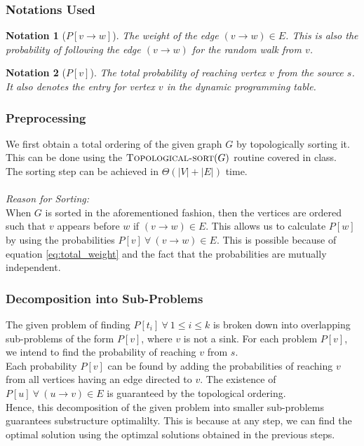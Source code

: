 \documentclass[12pt]{report}
\newtheorem{notation}{Notation}
\begin{document}
    \subsubsection*{Notations Used}
    \begin{notation}[$P{[v \to w]}$]
        The weight of the edge $(v \to w) \in E$. This is also the probability of following the edge $(v \to w)$ for the random walk from $v$.
    \end{notation}

    \begin{notation}[$P{[v]}$]
        The total probability of reaching vertex $v$ from the source $s$.
        It also denotes the entry for vertex $v$ in the dynamic programming table.
    \end{notation}

    \subsubsection*{Preprocessing}
    We first obtain a total ordering of the given graph $G$ by topologically sorting it.
    This can be done using the $\Call{Topological-sort}{G}$ routine covered in class. \\
    The sorting step can be achieved in $\Theta(|V|+|E|)$ time. \\
    \vspace*{2.5pt} \\
    \textit{Reason for Sorting:}
    \vspace*{2.5pt} \\
    When $G$ is sorted in the aforementioned fashion, then the vertices are ordered such that $v$ appears before $w$ if $(v \to w) \in E$.
    This allows us to calculate $P[w]$ by using the probabilities $P[v] \ \forall \ (v \to w) \in E$.
    This is possible because of equation \eqref{eq:total_weight} and the fact that the probabilities are mutually independent.

    \subsubsection*{Decomposition into Sub-Problems}
    The given problem of finding $P[t_{i}] \ \forall \ 1 \leq i \leq k$ is broken down into overlapping sub-problems of the form $P[v]$, where $v$ is not a sink.
    For each problem $P[v]$, we intend to find the probability of reaching $v$ from $s$. \\
    Each probability $P[v]$ can be found by adding the probabilities of reaching $v$ from all vertices having an edge directed to $v$.
    The existence of $P[u] \ \forall \ (u \to v) \in E$ is guaranteed by the topological ordering. \\
    Hence, this decomposition of the given problem into smaller sub-problems guarantees substructure optimalilty.
    This is because at any step, we can find the optimal solution using the optimzal solutions obtained in the previous steps.
\end{document}
